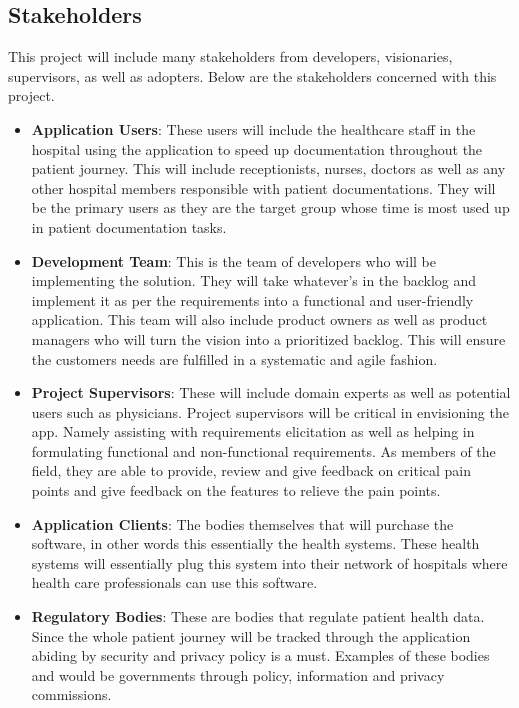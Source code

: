 \documentclass{article}
\begin{document}

\subsection{Stakeholders}

This project will include many stakeholders from developers, visionaries, supervisors, as well as adopters. Below are the stakeholders concerned with this project.
\begin{itemize}
    \item \textbf{Application Users}: These users will include the healthcare staff in the hospital using the application to speed up documentation throughout the patient journey. This will include receptionists, nurses, doctors as well as any other hospital members responsible with patient documentations. They will be the primary users as they are the target group whose time is most used up in patient documentation tasks.
    \item \textbf{Development Team}: This is the team of developers who will be implementing the solution. They will take whatever’s in the backlog and implement it as per the requirements into a functional and user-friendly application. This team will also include product owners as well as product managers who will turn the vision into a prioritized backlog. This will ensure the customers needs are fulfilled in a systematic and agile fashion.
    \item \textbf{Project Supervisors}: These will include domain experts as well as potential users such as physicians. Project supervisors will be critical in envisioning the app. Namely assisting with requirements elicitation as well as helping in formulating functional and non-functional requirements. As members of the field, they are able to provide, review and give feedback on critical pain points and give feedback on the features to relieve the pain points.
    \item \textbf{Application Clients}: The bodies themselves that will purchase the software, in other words this essentially the health systems. These health systems will essentially plug this system into their network of hospitals where health care professionals can use this software.
    \item \textbf{Regulatory Bodies}: These are bodies that regulate patient health data. Since the whole patient journey will be tracked through the application abiding by security and privacy policy is a must. Examples of these bodies and would be governments through policy, information and privacy commissions.
\end{itemize}
\end{document}
